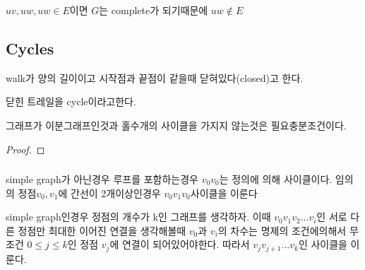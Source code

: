 \subsubsection{} 

\subsubsection{} 
$uv, uw, uw \in E $이면 $G$는 complete가 되기때문에 $uw \notin E$

\subsection{Cycles}

\begin{dfn}[cycle]
walk가 양의 길이이고 시작점과 끝점이 같을때 닫혀있다(closed)고 한다. 

닫힌 트레일을 cycle이라고한다.
\end{dfn}

\begin{theorem}
    그래프가 이분그래프인것과 홀수개의 사이클을 가지지 않는것은 필요충분조건이다.
\end{theorem}
\begin{proof}
    
\end{proof}
\subsubsection{} 
\subsubsection{} 
simple graph가 아닌경우
        루프를 포함하는경우 $v_0v_0$는 정의에 의해 사이클이다.
            임의의 정점$v_0, v_1$에 간선이 2개이상인경우            $v_0v_1v_0$사이클을 이룬다
        
    simple graph인경우
        정점의 개수가 k인 그래프를 생각하자. 이때 $v_0v_1v_2 ... v_i$인 서로 다른 정점만 최대한 이어진 연결을 생각해볼때 $v_0$과 $v_i$의 차수는 명제의 조건에의해서 무조건 $0 \le j \le k$인 정점 $v_j$에 연결이 되어있어야한다. 따라서 $v_{j}v_{j+1} ... v_k$인 사이클을 이룬다.
\subsubsection{} 
\subsubsection{} 
